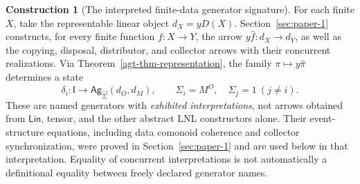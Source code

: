 \documentclass[11pt,a4paper]{article}
\numberwithin{equation}{section}
\theoremstyle{definition}
\newtheorem{construction}[construction]{Construction}
\theoremstyle{remark}
\theoremstyle{plain}
\providecommand{\Ag}{\mathsf{Ag}}
\providecommand{\sig}{\vec{\Sigma}}
\providecommand{\Lin}{\mathsf{Lin}}
\providecommand{\I}{\mathsf{I}}
\begin{document}
\begin{construction}[The interpreted finite-data generator signature]
\label{agt-con-finite-generators}
For each finite $X$, take the representable linear object
$d_X=yD(X)$.  Section~\ref{sec:paper-1} constructs, for every finite
function $f:X\to Y$, the arrow $y\widehat f:d_X\to d_Y$, as well
as the copying, disposal, distributor, and collector arrows with their
concurrent realizations.  Via Theorem~\ref{agt-thm-representation}, the
family $\pi\mapsto y\widehat\pi$ determines a state
\[
 \delta_i:\I\longrightarrow\Ag_{\sig}(d_O,d_M),\qquad
 \Sigma_i=M^O,\quad\Sigma_j=1\ (j\ne i).
\]
These are named generators with \emph{exhibited interpretations}, not
arrows obtained from $\Lin$, tensor, and the other abstract LNL
constructors alone.  Their event-structure equations, including data
comonoid coherence and collector synchronization, were proved in Section~\ref{sec:paper-1} and are used below in that interpretation.  Equality
of concurrent interpretations is not automatically a definitional equality
between freely declared generator names.
\end{construction}
\end{document}
